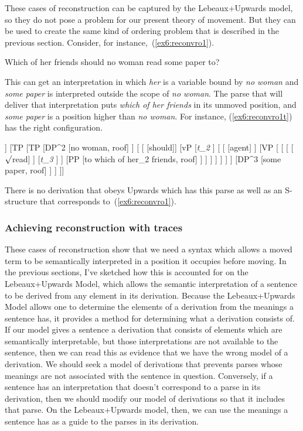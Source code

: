 These cases of reconstruction can be captured by the Lebeaux+Upwards model, so they do not pose a problem for our present theory of movement. But they can be used to create the same kind of ordering problem that is described in the previous section. Consider, for instance,~(\ref{ex6:reconvro1}).
\begin{exe}
\raggedright
	\ex \label{ex6:reconvro1}
	Which of her friends should no woman read some paper to?
\end{exe}
This can get an interpretation in which \emph{her} is a variable bound by \emph{no woman} and \emph{some paper} is interpreted outside the scope of \emph{no woman}. The parse that will deliver that interpretation puts \emph{which of her friends} in its unmoved position, and \emph{some paper} is a position higher than \emph{no woman}. For instance, (\ref{ex6:reconvro1t}) has the right configuration.
\begin{exe}
\raggedright
	\ex \label{ex6:reconvro1t}
	\small
	\begin{forest}
	[CP
		[\ibar{C}
		[\obar{C} [Q]]
		[TP
			[TP
				[DP^2 [no woman, roof] ]
				[ 
					[ [should]]
					[vP
						[\emph{t_2} ]
						[ 
							[ [agent] ]
							[VP [
								[
									[ [$\surd$read] ]
									[\emph{t_3} ]
								 ]
								[PP [to which of her_2 friends, roof] ]
							] ]
						 ]
					 ]
				]
			 ]
			[DP^3 [some paper, roof] ]
		 ]
	]]
	\end{forest}
\end{exe}
There is no derivation that obeys Upwards which has this parse as well as an S-structure that corresponds to~(\ref{ex6:reconvro1}).

\subsubsection{Achieving reconstruction with traces}
\label{sec:semanticrecon}

These cases of reconstruction show that we need a syntax which allows a moved term to be semantically interpreted in a position it occupies before moving. In the previous sections, I've sketched how this is accounted for on the Lebeaux+Upwards Model, which allows the semantic interpretation of a sentence to be derived from any element in its derivation. Because the Lebeaux+Upwards Model allows one to determine the elements of a derivation from the meanings a sentence has, it provides a method for determining what a derivation consists of. If our model gives a sentence a derivation that consists of elements which are semantically interpretable, but those interpretations are not available to the sentence, then we can read this as evidence that we have the wrong model of a derivation. We should seek a model of derivations that prevents parses whose meanings are not associated with the sentence in question. Conversely, if a sentence has an interpretation that doesn't correspond to a parse in its derivation, then we should modify our model of derivations so that it includes that parse. On the Lebeaux+Upwards model, then, we can use the meanings a sentence has as a guide to the parses in its derivation.

